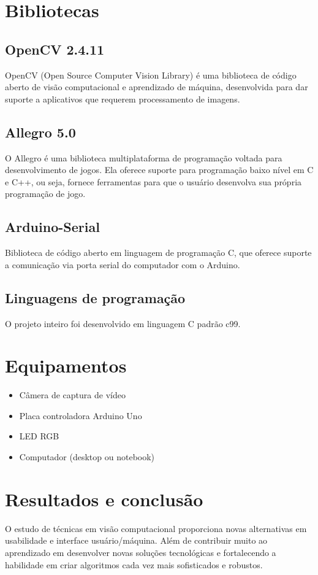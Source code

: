 \documentclass[12pt]{article}
\begin{document}
\section{Bibliotecas}
\subsection{OpenCV 2.4.11}
OpenCV (Open Source Computer Vision Library)
\'e uma biblioteca de c\'odigo aberto de vis\~ao computacional e aprendizado de m\'aquina,
desenvolvida para dar suporte a aplicativos que requerem processamento de imagens.
  
\subsection{Allegro 5.0}
O Allegro \'e uma biblioteca multiplataforma de programa\c c\~ao voltada para desenvolvimento de jogos. Ela
oferece suporte para programa\c c\~ao baixo n\'ivel em C e C++, ou seja, fornece ferramentas para que o usu\'ario
desenvolva sua pr\'opria programa\c c\~ao de jogo.
\subsection{Arduino-Serial}
Biblioteca de c\'odigo aberto em linguagem de programa\c c\~ao C, que oferece suporte a
comunica\c c\~ao via porta serial do computador com o Arduino.

\subsection{Linguagens de programa\c c\~ao}
O projeto inteiro foi desenvolvido em linguagem C padr\~ao c99.

\section{Equipamentos}
\begin{itemize}
\item C\^amera de captura de v\'ideo
\item Placa controladora Arduino Uno
\item LED RGB
\item Computador (desktop ou notebook)
\end{itemize}

\section{Resultados e conclus\~ao}
O estudo de t\'ecnicas em vis\~ao computacional proporciona novas alternativas em usabilidade e
interface usu\'ario/m\'aquina. Al\'em de contribuir muito ao aprendizado em desenvolver novas
solu\c c\~oes tecnol\'ogicas e fortalecendo a habilidade em criar algoritmos cada vez mais sofisticados e robustos.
\end{document}
